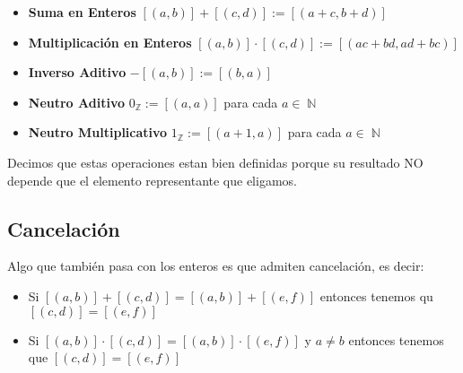 \documentclass[12pt, fleqn]{report}                             %
\DeclareMathOperator \Naturals  {\mathbb{N}}                     %
\DeclareMathOperator \Integers  {\mathbb{Z}}                     %
\begin{document}
            \begin{itemize}
                \item
                    \textbf{Suma en Enteros}
                    $[(a,b)] + [(c,d)] := [(a+c, b+d)]$

                \item
                    \textbf{Multiplicación en Enteros}
                    $[(a,b)] \cdot [(c,d)] := [(ac+bd, ad+bc)]$

                \item
                    \textbf{Inverso Aditivo}
                    $-[(a,b)] := [(b,a)]$

                \item
                    \textbf{Neutro Aditivo}
                    $0_{\Integers} := [(a,a)]$ para cada $a \in \Naturals$

                 \item
                    \textbf{Neutro Multiplicativo}
                    $1_{\Integers} := [(a+1,a)]$ para cada $a \in \Naturals$
            \end{itemize}


            Decimos que estas operaciones estan bien definidas porque su resultado NO depende que 
            el elemento representante que eligamos.


            \clearpage
            \subsection{Cancelación}

                Algo que también pasa con los enteros es que admiten cancelación, es decir:
                \begin{itemize}
                    \item
                        Si  $[(a,b)] + [(c,d)] = [(a,b)] + [(e,f)]$ entonces tenemos qu
                        $[(c,d)] = [(e,f)]$

                    \item
                        Si  $[(a,b)] \cdot [(c,d)] = [(a,b)] \cdot [(e,f)]$ y $a \neq b$ entonces
                        tenemos que $[(c,d)] = [(e,f)]$
                \end{itemize}




\end{document}
